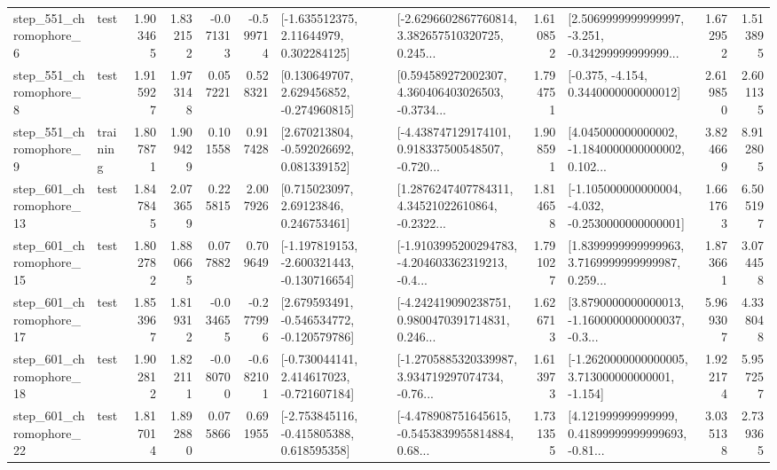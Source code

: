 \begin{tabular}{llrrrrllrlrr}
   step\_551\_chromophore\_6 &      test &      1.903465 &    1.832152 &     -0.071313 & -0.599714 &     [-1.635512375, 2.11644979, 0.302284125] &  [-2.6296602867760814, 3.382657510320725, 0.245... &       1.610852 &  [2.5069999999999997, -3.251, -0.34299999999999... &            1.672952 &          1.513895 \\
   step\_551\_chromophore\_8 &      test &      1.915927 &    1.973148 &      0.057221 &  0.528321 &    [0.130649707, 2.629456852, -0.274960815] &  [0.594589272002307, 4.360406403026503, -0.3734... &       1.794751 &               [-0.375, -4.154, 0.3440000000000012] &            2.619850 &          2.601135 \\
   step\_551\_chromophore\_9 &  training &      1.807871 &    1.909429 &      0.101558 &  0.917428 &    [2.670213804, -0.592026692, 0.081339152] &  [-4.438747129174101, 0.918337500548507, -0.720... &       1.908591 &  [4.045000000000002, -1.1840000000000002, 0.102... &            3.824669 &          8.912805 \\
  step\_601\_chromophore\_13 &      test &      1.847845 &    2.073659 &      0.225815 &  2.007926 &      [0.715023097, 2.69123846, 0.246753461] &  [1.2876247407784311, 4.34521022610864, -0.2322... &       1.814658 &  [-1.105000000000004, -4.032, -0.2530000000000001] &            1.661763 &          6.505197 \\
  step\_601\_chromophore\_15 &      test &      1.802782 &    1.880665 &      0.077882 &  0.709649 &  [-1.197819153, -2.600321443, -0.130716654] &  [-1.9103995200294783, -4.204603362319213, -0.4... &       1.791027 &  [1.8399999999999963, 3.7169999999999987, 0.259... &            1.873661 &          3.074458 \\
  step\_601\_chromophore\_17 &      test &      1.853967 &    1.819312 &     -0.034655 & -0.277996 &   [2.679593491, -0.546534772, -0.120579786] &  [-4.242419090238751, 0.9800470391714831, 0.246... &       1.626713 &  [3.8790000000000013, -1.1600000000000037, -0.3... &            5.969307 &          4.338048 \\
  step\_601\_chromophore\_18 &      test &      1.902812 &    1.822111 &     -0.080700 & -0.682101 &   [-0.730044141, 2.414617023, -0.721607184] &  [-1.2705885320339987, 3.934719297074734, -0.76... &       1.613973 &   [-1.2620000000000005, 3.713000000000001, -1.154] &            1.922174 &          5.957257 \\
  step\_601\_chromophore\_22 &      test &      1.817014 &    1.892880 &      0.075866 &  0.691955 &   [-2.753845116, -0.415805388, 0.618595358] &  [-4.478908751645615, -0.5453839955814884, 0.68... &       1.731355 &  [4.121999999999999, 0.41899999999999693, -0.81... &            3.035138 &          2.739365 \\

\end{tabular}
